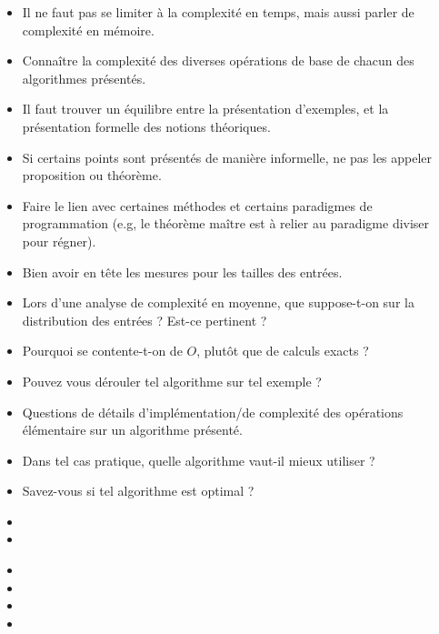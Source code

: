 \documentclass{agregfiche}
\begin{document}
\secpieges

\begin{itemize}
    \item Il ne faut pas se limiter à la complexité en temps, mais aussi parler de complexité en mémoire.
    \item Connaître la complexité des diverses opérations de base de chacun des algorithmes présentés.
    \item Il faut trouver un équilibre entre la présentation d'exemples, et la présentation formelle des notions théoriques.
    \item Si certains points sont présentés de manière informelle, ne pas les appeler proposition ou théorème.
    \item Faire le lien avec certaines méthodes et certains paradigmes
    de programmation (e.g, le théorème maître est à relier au
    paradigme diviser pour régner).
    \item Bien avoir en tête les mesures pour les tailles des entrées.
\end{itemize}

\secquestionsclassiques

\begin{itemize}
	\item Lors d'une analyse de complexité en moyenne, que
	suppose-t-on sur la distribution des entrées ? Est-ce pertinent ?
    \item Pourquoi se contente-t-on de $O$, plutôt que de calculs
    exacts ?
    \item Pouvez vous dérouler tel algorithme sur tel exemple ?
    \item Questions de détails d'implémentation/de complexité des opérations élémentaire sur un algorithme présenté.
    \item Dans tel cas pratique, quelle algorithme vaut-il mieux utiliser ?
    \item Savez-vous si tel algorithme est optimal ?

\end{itemize}

\secreferences

\begin{itemize}
\item 
\item 

\end{itemize}

\secdev

\begin{itemize}
\item 
\item 
\item 
\item 
\end{itemize}
\end{document}
